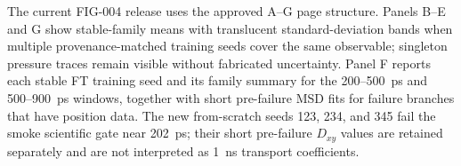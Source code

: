 The current FIG-004 release uses the approved A--G page structure. Panels B--E and G show stable-family means with translucent standard-deviation bands when multiple provenance-matched training seeds cover the same observable; singleton pressure traces remain visible without fabricated uncertainty. Panel F reports each stable FT training seed and its family summary for the 200--500~ps and 500--900~ps windows, together with short pre-failure MSD fits for failure branches that have position data. The new from-scratch seeds 123, 234, and 345 fail the smoke scientific gate near 202~ps; their short pre-failure $D_{xy}$ values are retained separately and are not interpreted as 1~ns transport coefficients.
